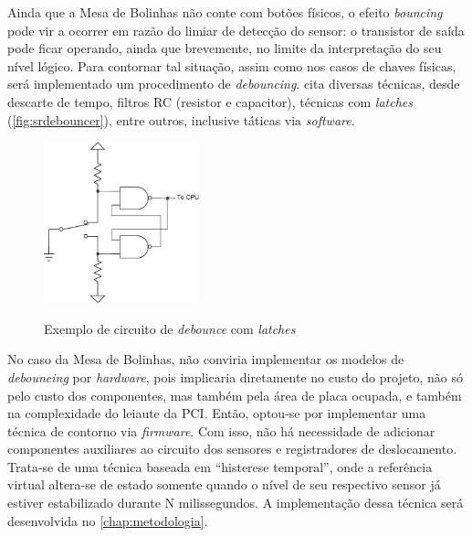 Ainda que a Mesa de Bolinhas não conte com botões físicos, o efeito \emph{bouncing} pode vir a ocorrer em razão do limiar de detecção do sensor: o transistor de saída pode ficar operando, ainda que brevemente, no limite da interpretação do seu nível lógico. Para contornar tal situação, assim como nos casos de chaves físicas, será implementado um procedimento de \emph{debouncing}.  cita diversas técnicas, desde descarte de tempo, filtros RC (resistor e capacitor), técnicas com \emph{latches} (\autoref{fig:srdebouncer}), entre outros, inclusive táticas via \emph{software}.

\begin{figure}[H]
    \centering
    \caption{Exemplo de circuito de \emph{debounce} com \emph{latches}}
    \includegraphics[width=0.4\textwidth]{./dados/figuras/srdebouncer}
    \label{fig:srdebouncer}
\end{figure}

No caso da Mesa de Bolinhas, não conviria implementar os modelos de  \emph{debouncing} por \emph{hardware}, pois implicaria diretamente no custo do projeto, não só pelo custo dos componentes, mas também pela área de placa ocupada, e também na complexidade do leiaute da PCI. Então, optou-se por implementar uma técnica de contorno via \emph{firmware}. Com isso, não há necessidade de adicionar componentes auxiliares ao circuito dos sensores e registradores de deslocamento. Trata-se de uma técnica baseada em ``histerese temporal'', onde a referência virtual altera-se de estado somente quando o nível de seu respectivo sensor já estiver estabilizado durante N milissegundos. A implementação dessa técnica será desenvolvida no \autoref{chap:metodologia}.
